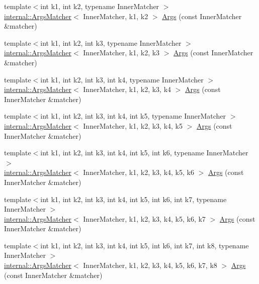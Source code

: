 \begin{DoxyCompactItemize}
\item 
{\footnotesize template$<$int k1, int k2, typename Inner\+Matcher $>$ }\\\hyperlink{classtesting_1_1internal_1_1ArgsMatcher}{internal\+::\+Args\+Matcher}$<$ Inner\+Matcher, k1, k2 $>$ \hyperlink{namespacetesting_a663409e441584c81f496e9c98fd3453c}{Args} (const Inner\+Matcher \&matcher)
\item 
{\footnotesize template$<$int k1, int k2, int k3, typename Inner\+Matcher $>$ }\\\hyperlink{classtesting_1_1internal_1_1ArgsMatcher}{internal\+::\+Args\+Matcher}$<$ Inner\+Matcher, k1, k2, k3 $>$ \hyperlink{namespacetesting_abd3ddae153e1c452b7625808cc4d820b}{Args} (const Inner\+Matcher \&matcher)
\item 
{\footnotesize template$<$int k1, int k2, int k3, int k4, typename Inner\+Matcher $>$ }\\\hyperlink{classtesting_1_1internal_1_1ArgsMatcher}{internal\+::\+Args\+Matcher}$<$ Inner\+Matcher, k1, k2, k3, k4 $>$ \hyperlink{namespacetesting_aeff7e644fd00516c3519fe8c0dc1aee2}{Args} (const Inner\+Matcher \&matcher)
\item 
{\footnotesize template$<$int k1, int k2, int k3, int k4, int k5, typename Inner\+Matcher $>$ }\\\hyperlink{classtesting_1_1internal_1_1ArgsMatcher}{internal\+::\+Args\+Matcher}$<$ Inner\+Matcher, k1, k2, k3, k4, k5 $>$ \hyperlink{namespacetesting_aede9fd33cce0d21f5e31ba10a0706827}{Args} (const Inner\+Matcher \&matcher)
\item 
{\footnotesize template$<$int k1, int k2, int k3, int k4, int k5, int k6, typename Inner\+Matcher $>$ }\\\hyperlink{classtesting_1_1internal_1_1ArgsMatcher}{internal\+::\+Args\+Matcher}$<$ Inner\+Matcher, k1, k2, k3, k4, k5, k6 $>$ \hyperlink{namespacetesting_abc92e87b4a9cad372b082d81479f3d48}{Args} (const Inner\+Matcher \&matcher)
\item 
{\footnotesize template$<$int k1, int k2, int k3, int k4, int k5, int k6, int k7, typename Inner\+Matcher $>$ }\\\hyperlink{classtesting_1_1internal_1_1ArgsMatcher}{internal\+::\+Args\+Matcher}$<$ Inner\+Matcher, k1, k2, k3, k4, k5, k6, k7 $>$ \hyperlink{namespacetesting_a9a9ef7a866b397430527076e342817f9}{Args} (const Inner\+Matcher \&matcher)
\item 
{\footnotesize template$<$int k1, int k2, int k3, int k4, int k5, int k6, int k7, int k8, typename Inner\+Matcher $>$ }\\\hyperlink{classtesting_1_1internal_1_1ArgsMatcher}{internal\+::\+Args\+Matcher}$<$ Inner\+Matcher, k1, k2, k3, k4, k5, k6, k7, k8 $>$ \hyperlink{namespacetesting_ae8a4e8e1b8eb87c9f1e5f02519da7fce}{Args} (const Inner\+Matcher \&matcher)

\end{DoxyCompactItemize}
